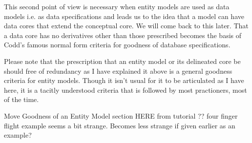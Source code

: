 This second point of view is necessary when entity models are used as data models i.e. as data specifications and leads us to the idea that a model can have data cores that extend the conceptual core. We will come back to this later. That a data core has no derivatives other than those prescribed becomes the basis of Codd's famous normal form criteria for goodness of database specifications. 

\mynote Please note that the prescription that an entity model or its delineated core be should free of redundancy as I have explained it above is a general goodness criteria for entity models. Though it isn't usual for it to be articulated as I have here, it is a  tacitly understood criteria that is followed by most practioners, most of the time. 

\begin{noteforfuture}
Move Goodness of an Entity Model section HERE from tutorial ??
four finger flight example seems a bit strange. 
Becomes less strange if given earlier as an example?
\end{noteforfuture}

